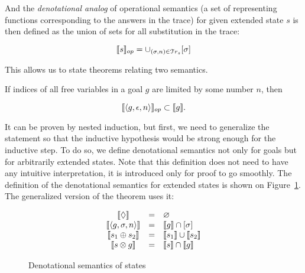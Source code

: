 And the \emph{denotational analog} of operational semantics (a set of representing functions corresponding to the answers in the trace) for given extended state $s$ is
then defined as the union of sets for all substitution in the trace:

\[
\llbracket{s}\rrbracket_{op} = \cup_{(\sigma, n) \in \mathcal{T}r_{s}} [\sigma]
\]

\begin{comment}
In \textsc{Coq} we again use a proposition instead:

\begin{lstlisting}[language=Coq]
   Definition in_denotational_analog
      (t : trace) (f : repr_fun) : Prop :=
      exists s n, in_stream (Answer s n) t /\
             in_denotational_sem_subst s f.
   Notation "{| t , f |}" := (in_denotational_analog t f).
\end{lstlisting}
\end{comment}

This allows us to state theorems relating two semantics.

\begin{theorem}
\label{OpSemSoundnessThm}
If indices of all free variables in a goal $g$ are limited by some number $n$, then

\[
\llbracket{\left<{g, \epsilon, n}\right>}\rrbracket_{op} \subset \llbracket{g}\rrbracket.
\]
\end{theorem}

It can be proven by nested induction, but first, we need to generalize the statement so that the inductive hypothesis would be strong enough for the inductive step.
To do so, we define denotational semantics not only for goals but for arbitrarily extended states. Note that this definition does not need to have any intuitive
interpretation, it is introduced only for proof to go smoothly. The definition of the denotational semantics for extended states is shown on Figure~\ref{denotational_semantics_of_states}.
The generalized version of the theorem uses it:

\begin{figure}[t]
  \[
  \begin{array}{ccl}
    \llbracket{\Diamond}\rrbracket&=&\varnothing\\
    \llbracket{\left<{g, \sigma, n}\right>}\rrbracket&=&\llbracket{g}\rrbracket\cap[\sigma]\\
    \llbracket{s_1 \oplus s_2}\rrbracket&=&\llbracket{s_1}\rrbracket\cup\llbracket{s_2}\rrbracket\\
    \llbracket{s \otimes g}\rrbracket&=&\llbracket{s}\rrbracket\cap\llbracket{g}\rrbracket\\
  \end{array}
  \]
  \caption{Denotational semantics of states}
  \label{denotational_semantics_of_states}
\end{figure}

